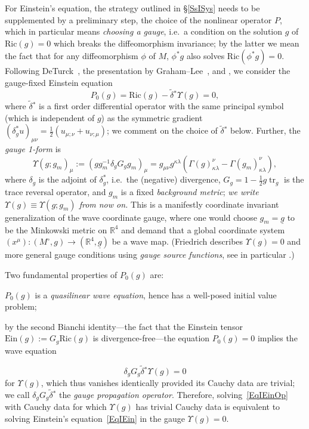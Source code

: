 \documentclass[reqno,11pt,letterpaper]{amsart}
\numberwithin{equation}{section}
\numberwithin{figure}{section}
\theoremstyle{definition}
\theoremstyle{remark}
\newcommand{\R}{\mathbb{R}}
\newcommand{\tr}{\operatorname{tr}}
\newcommand{\Ups}{\Upsilon}
\newcommand{\ul}[1]{\underline{#1}{}}
\newcommand{\wt}{\widetilde}
\newcommand{\half}{\tfrac{1}{2}}
\newcommand{\tdel}{\wt{\delta}{}}
\newcommand{\Ric}{\mathrm{Ric}}
\newcommand{\Ein}{\mathrm{Ein}}
\begin{document}
For Einstein's equation, the strategy outlined in \S\ref{SsISys} needs to be supplemented by a preliminary step, the choice of the nonlinear operator $P$, which in particular means \emph{choosing a gauge}, i.e.\ a condition on the solution $g$ of $\Ric(g)=0$ which breaks the diffeomorphism invariance; by the latter we mean the fact that for any diffeomorphism $\phi$ of $M$, $\phi^*g$ also solves $\Ric(\phi^*g)=0$. Following DeTurck~\cite{DeTurckPrescribedRicci}, the presentation by Graham--Lee~\cite{GrahamLeeConformalEinstein}, and \cite{HintzVasyKdSStability}, we consider the gauge-fixed Einstein equation
\begin{equation}
\label{EqIEinOp}
  P_0(g) = \Ric(g) - \tdel^*\Ups(g) = 0,
\end{equation}
where $\tdel^*$ is a first order differential operator with the same principal symbol (which is independent of $g$) as the symmetric gradient $(\delta_g^*u)_{\mu\nu}=\half(u_{\mu;\nu}+u_{\nu;\mu})$; we comment on the choice of $\tdel^*$ below. Further, the \emph{gauge 1-form} is
\begin{equation}
\label{EqIEinUps}
  \Ups(g;g_m)_\mu := (g g_m^{-1}\delta_g G_g g_m)_\mu = g_{\mu\nu}g^{\kappa\lambda}(\Gamma(g)_{\kappa\lambda}^\nu - \Gamma(g_m)_{\kappa\lambda}^\nu),
\end{equation}
where $\delta_g$ is the adjoint of $\delta_g^*$, i.e.\ the (negative) divergence, $G_g=1-\half g\tr_g$ is the trace reversal operator, and $g_m$ is a fixed \emph{background metric}; \textit{we write $\Ups(g)\equiv\Ups(g;g_m)$ from now on.} This is a manifestly coordinate invariant generalization of the wave coordinate gauge, where one would choose $g_m=\ul g$ to be the Minkowski metric on $\R^4$ and demand that a global coordinate system $(x^\mu)\colon(M^\circ,g)\to(\R^4,\ul g)$ be a wave map. (Friedrich describes $\Ups(g)=0$ and more general gauge conditions using \emph{gauge source functions}, see in particular \cite[Equation~(3.23)]{FriedrichHyperbolicityEinstein}.)

Two fundamental properties of $P_0(g)$ are: \begin{enumerate*} \item $P_0(g)$ is a \emph{quasilinear wave equation}, hence has a well-posed initial value problem; \item by the second Bianchi identity---the fact that the Einstein tensor $\Ein(g):=G_g\Ric(g)$ is divergence-free---the equation $P_0(g)=0$ implies the wave equation \end{enumerate*}
\begin{equation}
\label{EqIEinUpsProp}
  \delta_g G_g\tdel^*\Ups(g)=0
\end{equation}
for $\Ups(g)$, which thus vanishes identically provided its Cauchy data are trivial; we call $\delta_g G_g\tdel^*$ the \emph{gauge propagation operator}. Therefore, solving~\eqref{EqIEinOp} with Cauchy data for which $\Ups(g)$ has trivial Cauchy data is equivalent to solving Einstein's equation~\eqref{EqIEin} in the gauge $\Ups(g)=0$.
\end{document}

